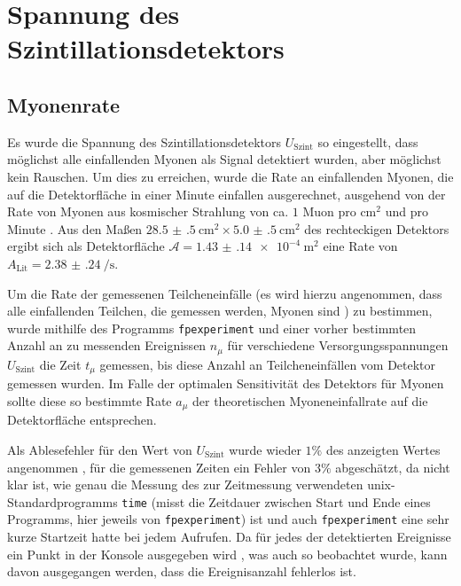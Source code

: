 \chapter{Spannung des Szintillationsdetektors}

\section{Myonenrate}\label{sec:myonenratios}

Es wurde die Spannung des Szintillationsdetektors $U_\text{Szint}$ so eingestellt, dass möglichst alle einfallenden Myonen als Signal detektiert wurden, aber möglichst kein Rauschen. Um dies zu erreichen, wurde die Rate an einfallenden Myonen, die auf die Detektorfläche in einer Minute einfallen ausgerechnet, ausgehend von der Rate von Myonen aus kosmischer Strahlung von ca. $1$ Muon pro $\text{cm}^2$ und pro Minute \cite[145]{astroparticles}. Aus den Maßen $\SI{28.5(5)}{\centi\m^2}\times\SI{5.0(5)}{\centi\m^2}$ des rechteckigen Detektors ergibt sich als Detektorfläche $\mathcal{A}=\SI{1.43(14)e-4}{\m^2}$ eine Rate von $A_\text{Lit}=\SI{2.38(24)}{\per\s}$.

Um die Rate der gemessenen Teilcheneinfälle (es wird hierzu angenommen, dass alle einfallenden Teilchen, die gemessen werden, Myonen sind \cite[2]{515versuchsanleitung}) zu bestimmen, wurde mithilfe des Programms \texttt{fpexperiment} \cite[5-6]{515versuchsanleitung} und einer vorher bestimmten Anzahl an zu messenden Ereignissen $n_\mu$ für verschiedene Versorgungsspannungen $U_\text{Szint}$ die Zeit $t_\mu$ gemessen, bis diese Anzahl an Teilcheneinfällen vom Detektor gemessen wurden.
Im Falle der optimalen Sensitivität des Detektors für Myonen sollte diese so bestimmte Rate $a_\mu$ der theoretischen Myoneneinfallrate auf die Detektorfläche entsprechen.

Als Ablesefehler für den Wert von $U_\text{Szint}$ wurde wieder $1\%$ des anzeigten Wertes angenommen \cite[2]{515versuchsanleitung}, für die gemessenen Zeiten ein Fehler von $3\%$ abgeschätzt, da nicht klar ist, wie genau die Messung des zur Zeitmessung verwendeten unix-Standardprogramms \texttt{time} \cite{timeunix}(misst die Zeitdauer zwischen Start und Ende eines Programms, hier jeweils von \texttt{fpexperiment}) ist und auch \texttt{fpexperiment} eine sehr kurze Startzeit hatte bei jedem Aufrufen. Da für jedes der detektierten Ereignisse ein Punkt in der Konsole ausgegeben wird \cite[6]{515versuchsanleitung}, was auch so beobachtet wurde, kann davon ausgegangen werden, dass die Ereignisanzahl fehlerlos ist.

